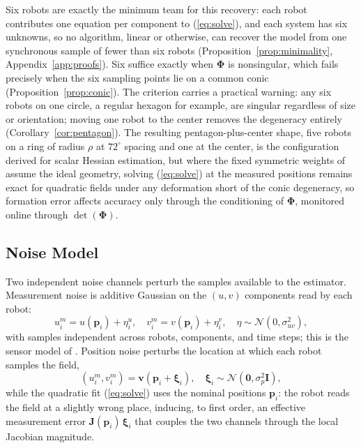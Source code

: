 \documentclass[lettersize,journal]{IEEEtran}
\begin{document}
Six robots are exactly the minimum team for this recovery: each robot
contributes one equation per component to (\ref{eq:solve}), and each
system has six unknowns, so no algorithm, linear or otherwise, can
recover the model from one synchronous sample of fewer than six robots
(Proposition~\ref{prop:minimality}, Appendix~\ref{app:proofs}). Six
suffice exactly when $\boldsymbol{\Phi}$ is nonsingular, which fails
precisely when the six sampling points lie on a common conic
(Proposition~\ref{prop:conic}). The criterion carries a practical
warning: any six robots on one circle, a regular hexagon for example,
are singular regardless of size or orientation; moving one robot to the
center removes the degeneracy entirely (Corollary~\ref{cor:pentagon}).
The resulting pentagon-plus-center shape, five robots on a ring of
radius $\rho$ at $72^\circ$ spacing and one at the center, is the
configuration \cite{15} derived for scalar Hessian estimation, but
where the fixed symmetric weights of \cite{15} assume the ideal
geometry, solving (\ref{eq:solve}) at the measured positions remains
exact for quadratic fields under any deformation short of the conic
degeneracy, so formation error affects accuracy only through the
conditioning of $\boldsymbol{\Phi}$, monitored online through
$\det(\boldsymbol{\Phi})$.

\subsection{Noise Model}
\label{sec:noise_model}

Two independent noise channels perturb the samples available to the
estimator. Measurement noise is additive Gaussian on the $(u, v)$
components read by each robot:
\begin{equation}
    u_i^m = u(\mathbf{p}_i) + \eta_i^u, \quad
    v_i^m = v(\mathbf{p}_i) + \eta_i^v,
    \quad \eta \sim \mathcal{N}(0, \sigma_{uv}^2),
    \label{eq:meas_noise}
\end{equation}
with samples independent across robots, components, and time steps; this
is the sensor model of \cite{9}. Position noise perturbs the location at
which each robot samples the field,
\begin{equation}
    (u_i^m, v_i^m) = \mathbf{v}(\mathbf{p}_i + \boldsymbol{\xi}_i), \quad
    \boldsymbol{\xi}_i \sim \mathcal{N}(\mathbf{0}, \sigma_p^2 \mathbf{I}),
    \label{eq:pos_noise}
\end{equation}
while the quadratic fit (\ref{eq:solve}) uses the nominal positions
$\mathbf{p}_i$: the robot reads the field at a slightly wrong place,
inducing, to first order, an effective measurement error
$\mathbf{J}(\mathbf{p}_i)\,\boldsymbol{\xi}_i$ that couples the two
channels through the local Jacobian magnitude.
\end{document}
